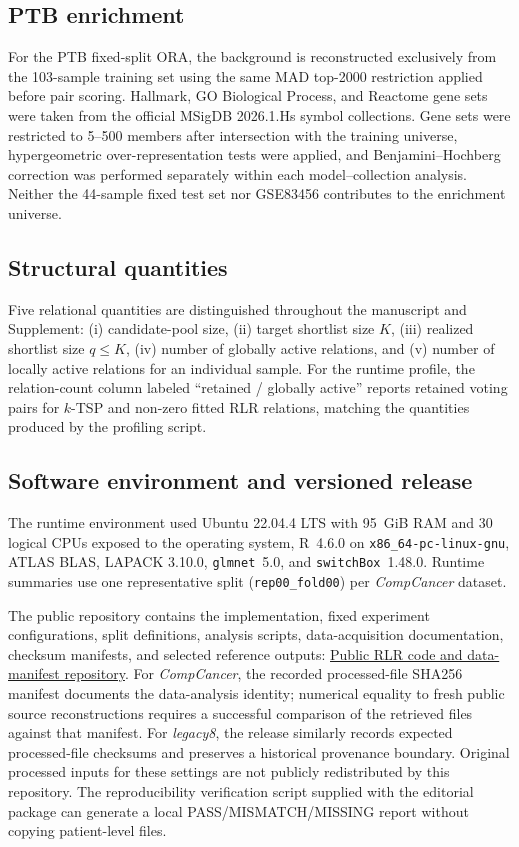 \documentclass[11pt, a4paper]{article}
\begin{document}
\subsection*{PTB enrichment}

For the PTB fixed-split ORA, the background is reconstructed exclusively from the 103-sample training set using the same MAD top-2000 restriction applied before pair scoring. Hallmark, GO Biological Process, and Reactome gene sets were taken from the official MSigDB 2026.1.Hs symbol collections. Gene sets were restricted to 5--500 members after intersection with the training universe, hypergeometric over-representation tests were applied, and Benjamini--Hochberg correction was performed separately within each model--collection analysis. Neither the 44-sample fixed test set nor GSE83456 contributes to the enrichment universe.

\subsection*{Structural quantities}

Five relational quantities are distinguished throughout the manuscript and Supplement:
(i) candidate-pool size,
(ii) target shortlist size $K$,
(iii) realized shortlist size $q\leq K$,
(iv) number of globally active relations, and
(v) number of locally active relations for an individual sample.
For the runtime profile, the relation-count column labeled ``retained / globally active'' reports retained voting pairs for $k$-TSP and non-zero fitted RLR relations, matching the quantities produced by the profiling script.

\subsection*{Software environment and versioned release}

The runtime environment used Ubuntu 22.04.4 LTS with 95~GiB RAM and 30 logical CPUs exposed to the operating system, R~4.6.0 on \texttt{x86\_64-pc-linux-gnu}, ATLAS BLAS, LAPACK 3.10.0, \texttt{glmnet}~5.0, and \texttt{switchBox}~1.48.0. Runtime summaries use one representative split (\texttt{rep00\_fold00}) per \emph{CompCancer} dataset.

The public repository contains the implementation, fixed experiment configurations, split definitions, analysis scripts, data-acquisition documentation, checksum manifests, and selected reference outputs:
\href{https://github.com/mczajkowskipb/relative-logistic-regression}{Public RLR code and data-manifest repository}.
For \emph{CompCancer}, the recorded processed-file SHA256 manifest documents the data-analysis identity; numerical equality to fresh public source reconstructions requires a successful comparison of the retrieved files against that manifest. For \emph{legacy8}, the release similarly records expected processed-file checksums and preserves a historical provenance boundary. Original processed inputs for these settings are not publicly redistributed by this repository. The reproducibility verification script supplied with the editorial package can generate a local PASS/MISMATCH/MISSING report without copying patient-level files.
\end{document}
